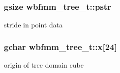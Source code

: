 \subsubsection[{pstr}]{\setlength{\rightskip}{0pt plus 5cm}gsize wbfmm\+\_\+tree\+\_\+t\+::pstr}\label{structwbfmm__tree__t_a96d1d01546cca1baf4a6a8c953ad1252}
stride in point data 
\subsubsection[{x}]{\setlength{\rightskip}{0pt plus 5cm}gchar wbfmm\+\_\+tree\+\_\+t\+::x[24]}\label{structwbfmm__tree__t_a44e44f2c0eabe36743d1f975b0d0798c}
origin of tree domain cube 